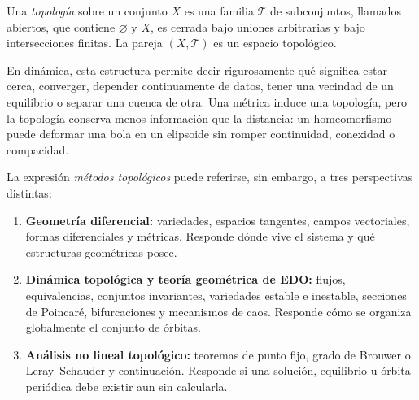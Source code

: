 \begin{definition}
Una \emph{topología} sobre un conjunto $X$ es una familia $\mathcal T$ de
subconjuntos, llamados abiertos, que contiene $\varnothing$ y $X$, es cerrada
bajo uniones arbitrarias y bajo intersecciones finitas. La pareja
$(X,\mathcal T)$ es un espacio topológico.
\end{definition}

En dinámica, esta estructura permite decir rigurosamente qué significa estar
cerca, converger, depender continuamente de datos, tener una vecindad de un
equilibrio o separar una cuenca de otra. Una métrica induce una topología, pero
la topología conserva menos información que la distancia: un homeomorfismo
puede deformar una bola en un elipsoide sin romper continuidad, conexidad o
compacidad.

La expresión \emph{métodos topológicos} puede referirse, sin embargo, a tres
perspectivas distintas:

\begin{enumerate}
 \item \textbf{Geometría diferencial:} variedades, espacios tangentes,
 campos vectoriales, formas diferenciales y métricas. Responde dónde vive el
 sistema y qué estructuras geométricas posee.
 \item \textbf{Dinámica topológica y teoría geométrica de EDO:} flujos,
 equivalencias, conjuntos invariantes, variedades estable e inestable,
 secciones de Poincaré, bifurcaciones y mecanismos de caos. Responde cómo se
 organiza globalmente el conjunto de órbitas.
 \item \textbf{Análisis no lineal topológico:} teoremas de punto fijo, grado
 de Brouwer o Leray--Schauder y continuación. Responde si una solución,
 equilibrio u órbita periódica debe existir aun sin calcularla.
\end{enumerate}

